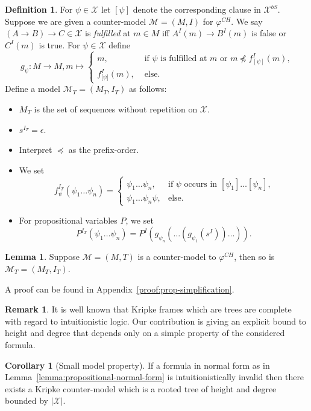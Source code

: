 \documentclass{easychair}
\theoremstyle{definition}
\theoremstyle{definition}
\newtheorem{corollary}[theorem]{Corollary}
\theoremstyle{definition}
\newtheorem{lemma}[theorem]{Lemma}
\theoremstyle{definition}
\theoremstyle{definition}
\newtheorem{definition}[theorem]{Definition}
\theoremstyle{definition}
\theoremstyle{definition}
\newtheorem{remark}[theorem]{Remark}
\begin{document}
\begin{definition}
For $\psi\in\mathcal X$ let $[\psi]$ denote the corresponding clause in $\mathcal X^{b S}$. Suppose we are given a counter-model $\mathcal M = (M, I)$ for $\varphi^{CH}$.
We say $(A\to B)\to C\in\mathcal X$ is \emph{fulfilled} at $m\in M$ iff $A^I(m)\to B^I(m)$ is false or $C^I(m)$ is true. For $\psi\in\mathcal X$ define $$g_\psi : M\to M, m\mapsto\begin{cases}
		m,&\text{ if $\psi$ is fulfilled at $m$ or $m\not\preceq f^I_{[\psi]}(m)$,}\\
		f^I_{\lbrack\psi\rbrack}(m),&\text{ else.}		
	\end{cases}$$Define a model $\mathcal M_T = (M_T, I_T)$ as follows:
	\begin{itemize}
		\item $M_T$ is the set of sequences without repetition on $\mathcal X$.
		\item $s^{I_T} = \epsilon$.
		\item Interpret $\preceq$ as the prefix-order.
		\item We set $$f_\psi^{I_T}(\psi_1\dots\psi_n) = \begin{cases}
			\psi_1\dots\psi_n, &\text{if $\psi$ occurs in $[\psi_1]\dots[\psi_n]$,}\\
			\psi_1\dots\psi_n\psi, &\text{else.}			
		\end{cases}$$
		\item For propositional variables $P$, we set $$P^{I_T}\left(\psi_1\dots \psi_n\right) = P^I\left(g_{\psi_n}\left(\dots\left(g_{\psi_1}\left(s^I\right)\right)\dots\right)\right).$$
	\end{itemize}
\end{definition}

\begin{lemma}
	Suppose $\mathcal M = (M, T)$ is a counter-model to $\varphi^{CH}$, then so is $\mathcal M_T = (M_T, I_T)$.
\end{lemma}

A proof can be found in Appendix~\ref{proof:prop-simplification}.

\begin{remark}
	It is well known that Kripke frames which are trees are complete with regard to intuitionistic logic. Our contribution is giving an explicit bound to height and degree that depends only on a simple property of the considered formula.
\end{remark}

\begin{corollary}[Small model property]
	If a formula in normal form as in Lemma~\ref{lemma:propositional-normal-form} is intuitionistically invalid then there exists a Kripke counter-model which is a rooted tree of height and degree bounded by $|\mathcal X|$.
\end{corollary}
\end{document}
